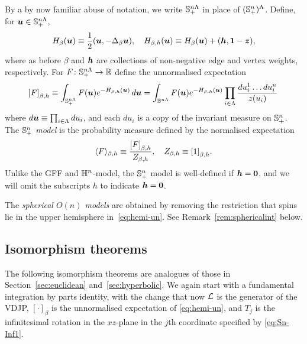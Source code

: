 \documentclass[11pt,a4paper]{article}
\begin{document}
By a by now familiar abuse of notation, we write ${\mathbb S}^{n\Lambda}_+$ in
place of $({\mathbb S}^{n}_+)^{\Lambda}$. Define,
for $\boldsymbol{u}\in {\ensuremath{\mathbb S}}^{n\Lambda}_+$,
\begin{equation}
  \label{eq:hemi-H}
  H_{\beta}(\boldsymbol{u}) \equiv \frac{1}{2}(\boldsymbol{u},-\Delta_{\beta}\boldsymbol{u}), 
  \quad H_{\beta,h}(\boldsymbol{u}) \equiv H_{\beta}(\boldsymbol{u}) + (\boldsymbol{h},\boldsymbol{1}-\boldsymbol{z}),
\end{equation}
where as before $\beta$ and $\boldsymbol{h}$ are collections of
non-negative edge and vertex weights, respectively.
For $F\colon {\ensuremath{\mathbb S}}^{n\Lambda}_+\to \mathbb{R}$ define the unnormalised
expectation
\begin{equation}
  \label{eq:hemi-un}
  \cb{F}_{\beta,h} \bydef
  \int_{\bbS^{n\Lambda}_{+}}F(\V{u})e^{-H_{\beta,h}(\V{u})}
  \,d\V{u}
  =
  \int_{\ball^{n\Lambda}} F(\V{u}) e^{-H_{\beta,h}(\V{u})}
  \prod_{i\in\Lambda} \frac{du_{i}^{1}\dots du_{i}^{n}}{z(u_{i})}\,
\end{equation}
where $d\boldsymbol{u} \equiv \prod_{i\in\Lambda}du_{i}$, and each $du_{i}$ is
a copy of the invariant measure on ${\mathbb S}^{n}_+$.  The
\emph{${\mathbb S}^{n}_{+}$ model} is the probability measure defined by the
normalised expectation
\begin{equation}
  \label{eq:hemi-norm}
  \avg{F}_{\beta,h} \bydef \frac{\cb{F}_{\beta,h}}{Z_{\beta,h}}, \quad
  Z_{\beta,h}\bydef \cb{1}_{\beta,h}.
\end{equation}
Unlike the GFF and $\mathbb{H}^{n}$-model, the ${\mathbb S}^{n}_{+}$ model is well-defined if
$\boldsymbol{h}=\boldsymbol{0}$, and we will omit the subscripts $h$ to indicate $\boldsymbol{h}=\boldsymbol{0}$.

\begin{remark}
  \label{rem:Full-sphere}
  The \emph{spherical $O(n)$ models} are obtained by removing the
  restriction that spins lie in the upper hemisphere
  in~\eqref{eq:hemi-un}. See Remark~\ref{rem:sphericalint} below.
\end{remark}

\subsection{Isomorphism theorems}
\label{sec:isomorphism-theorems-hem}


The following isomorphism theorems are analogues of those in
Section~\ref{sec:euclidean} and~\ref{sec:hyperbolic}.  We again start
with a fundamental integration by parts identity, with the change that
now $\mathcal L$ is the generator of the VDJP, $[\cdot]_\beta$ is the
unnormalised expectation of \eqref{eq:hemi-un}, and $T_j$ is the
infinitesimal rotation in the $xz$-plane in the $j$th coordinate
specified by \eqref{eq:Sn-Inf1}.
\end{document}
